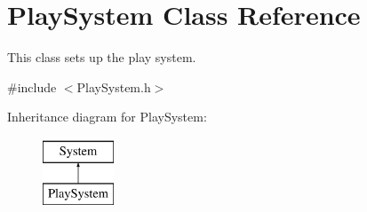 \hypertarget{class_play_system}{}\section{Play\+System Class Reference}
\label{class_play_system}


This class sets up the play system.  




{\ttfamily \#include $<$Play\+System.\+h$>$}

Inheritance diagram for Play\+System\+:\begin{figure}[H]
\begin{center}
\leavevmode
\includegraphics[height=2.000000cm]{class_play_system}
\end{center}
\end{figure}
